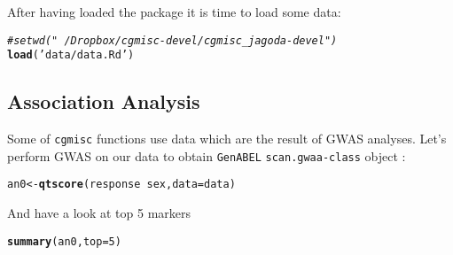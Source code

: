 \documentclass[12pt,a4paper,oneside]{article}\usepackage[]{graphicx}\usepackage[]{color}
\makeatletter
\newcommand{\hlnum}[1]{\textcolor[rgb]{0.686,0.059,0.569}{#1}}%
\newcommand{\hlstr}[1]{\textcolor[rgb]{0.192,0.494,0.8}{#1}}%
\newcommand{\hlcom}[1]{\textcolor[rgb]{0.678,0.584,0.686}{\textit{#1}}}%
\newcommand{\hlopt}[1]{\textcolor[rgb]{0,0,0}{#1}}%
\newcommand{\hlstd}[1]{\textcolor[rgb]{0.345,0.345,0.345}{#1}}%
\newcommand{\hlkwb}[1]{\textcolor[rgb]{0.69,0.353,0.396}{#1}}%
\newcommand{\hlkwc}[1]{\textcolor[rgb]{0.333,0.667,0.333}{#1}}%
\newcommand{\hlkwd}[1]{\textcolor[rgb]{0.737,0.353,0.396}{\textbf{#1}}}%
\newenvironment{kframe}{%
 \def\at@end@of@kframe{}%
 \ifinner\ifhmode%
  \def\at@end@of@kframe{\end{minipage}}%
  \begin{minipage}{\columnwidth}%
 \fi\fi%
 \def\FrameCommand##1{\hskip\@totalleftmargin \hskip-\fboxsep
 \colorbox{shadecolor}{##1}\hskip-\fboxsep
     \hskip-\linewidth \hskip-\@totalleftmargin \hskip\columnwidth}%
 \MakeFramed {\advance\hsize-\width
   \@totalleftmargin\z@ \linewidth\hsize
   \@setminipage}}%
 {\par\unskip\endMakeFramed%
 \at@end@of@kframe}
\newenvironment{knitrout}{}{} %
\makeatother
\begin{document}
\noindent After having loaded the package it is time to load some data:

\begin{knitrout}\footnotesize
{}\color{fgcolor}\begin{kframe}
\begin{alltt}
  \hlcom{#setwd("~/Dropbox/cgmisc-devel/cgmisc_jagoda-devel")}
  \hlkwd{load}\hlstd{(}\hlstr{'data/data.Rd'}\hlstd{)}
\end{alltt}


{\ttfamily\noindent\color{warningcolor}{\#\# Warning: cannot open compressed file 'data/data.Rd', probable reason 'No such file or directory'}}

{\ttfamily\noindent\bfseries\color{errorcolor}{\#\# Error: cannot open the connection}}\end{kframe}
\end{knitrout}

\subsection{Association Analysis}
\noindent Some of \texttt{cgmisc} functions use data which are the result of GWAS analyses. Let's perform GWAS on our data to obtain \texttt{GenABEL} \texttt{scan.gwaa-class} object : 

\begin{knitrout}\footnotesize
{}\color{fgcolor}\begin{kframe}
\begin{alltt}
\hlstd{an0} \hlkwb{<-} \hlkwd{qtscore}\hlstd{(response} \hlopt{~} \hlstd{sex,} \hlkwc{data} \hlstd{= data)}
\end{alltt}


{\ttfamily\noindent\bfseries\color{errorcolor}{\#\# Error: wrong data class: should be gwaa.data}}\end{kframe}
\end{knitrout}

\noindent And have a look at top 5 markers

\begin{knitrout}\footnotesize
{}\color{fgcolor}\begin{kframe}
\begin{alltt}
\hlkwd{summary}\hlstd{(an0,} \hlkwc{top} \hlstd{=} \hlnum{5}\hlstd{)}
\end{alltt}


{\ttfamily\noindent\bfseries\color{errorcolor}{\#\# Error: object 'an0' not found}}\end{kframe}
\end{knitrout}
\end{document}
